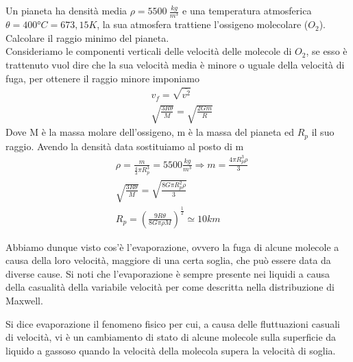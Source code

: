 \documentclass[
10pt, %
a4paper, %
oneside, %
headinclude,footinclude, %
BCOR5mm, %
]{scrartcl}
\begin{document}
\begin{exercise}
	Un pianeta ha densità media $\rho = 5500\ \frac{kg}{m^3}$ e una temperatura atmosferica $\theta = 400 °C = 673,15 K$, la sua atmosfera trattiene l'ossigeno molecolare ($O_2$). Calcolare il raggio minimo del pianeta.\\
	Consideriamo le componenti verticali delle velocità delle molecole di $O_2$, se esso è trattenuto vuol dire che la sua velocità media è minore o uguale della velocità di fuga, per ottenere il raggio minore imponiamo 
	\begin{align*} 
		&v_f = \sqrt{\overline{v^2}}\\
		&\sqrt{\frac{3 R \theta}{M}} = \sqrt{\frac{2 G m}{R}}
	\end{align*} 
	Dove M è la massa molare dell'ossigeno, m è la massa del pianeta ed $R_p$ il suo raggio. Avendo la densità data sostituiamo al posto di m 
	\begin{align*} 
		&\rho = \frac{m}{\frac{4}{3}\pi R_p^3}=5500 \frac{kg}{m^3} \Rightarrow m = \frac{4 \pi R_p^3 \rho}{3}\\
		&\sqrt{\frac{3 R\theta}{M}} = \sqrt{\frac{8 G \pi R_p^2 \rho}{3}}\\
		& R_p = \left(\frac{9 R \theta}{8G\pi \rho M}\right)^{\frac{1}{2}}\simeq 10 km
	\end{align*} 
\end{exercise}
Abbiamo dunque visto cos'è l'evaporazione, ovvero la fuga di alcune molecole a causa della loro velocità, maggiore di una certa soglia, che può essere data da diverse cause. Si noti che l'evaporazione è sempre presente nei liquidi a causa della casualità della variabile velocità per come descritta nella distribuzione di Maxwell.
\begin{definition}
	Si dice evaporazione il fenomeno fisico per cui, a causa delle fluttuazioni casuali di velocità, vi è un cambiamento di stato di alcune molecole sulla superficie da liquido a gassoso quando la velocità della molecola supera la velocità di soglia. 
\end{definition}
\end{document}
